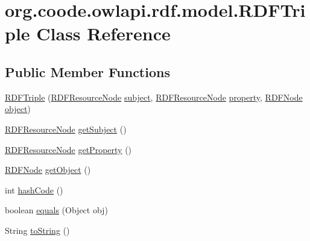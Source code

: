 \hypertarget{classorg_1_1coode_1_1owlapi_1_1rdf_1_1model_1_1_r_d_f_triple}{\section{org.\-coode.\-owlapi.\-rdf.\-model.\-R\-D\-F\-Triple Class Reference}
\label{classorg_1_1coode_1_1owlapi_1_1rdf_1_1model_1_1_r_d_f_triple}
}
\subsection*{Public Member Functions}
\begin{DoxyCompactItemize}
\item 
\hyperlink{classorg_1_1coode_1_1owlapi_1_1rdf_1_1model_1_1_r_d_f_triple_a9f9c792eeb8c7da6ff0cad21a31f2c48}{R\-D\-F\-Triple} (\hyperlink{classorg_1_1coode_1_1owlapi_1_1rdf_1_1model_1_1_r_d_f_resource_node}{R\-D\-F\-Resource\-Node} \hyperlink{classorg_1_1coode_1_1owlapi_1_1rdf_1_1model_1_1_r_d_f_triple_a8e8236c19fd75f36b6f395d2505b2443}{subject}, \hyperlink{classorg_1_1coode_1_1owlapi_1_1rdf_1_1model_1_1_r_d_f_resource_node}{R\-D\-F\-Resource\-Node} \hyperlink{classorg_1_1coode_1_1owlapi_1_1rdf_1_1model_1_1_r_d_f_triple_a6b9f9cd4fed026fa8398be4aa8f736ac}{property}, \hyperlink{classorg_1_1coode_1_1owlapi_1_1rdf_1_1model_1_1_r_d_f_node}{R\-D\-F\-Node} \hyperlink{classorg_1_1coode_1_1owlapi_1_1rdf_1_1model_1_1_r_d_f_triple_aee655bad73651f8c49524098fc1d8b9f}{object})
\item 
\hyperlink{classorg_1_1coode_1_1owlapi_1_1rdf_1_1model_1_1_r_d_f_resource_node}{R\-D\-F\-Resource\-Node} \hyperlink{classorg_1_1coode_1_1owlapi_1_1rdf_1_1model_1_1_r_d_f_triple_a40565a80b2b88a31874c0b728d143d2b}{get\-Subject} ()
\item 
\hyperlink{classorg_1_1coode_1_1owlapi_1_1rdf_1_1model_1_1_r_d_f_resource_node}{R\-D\-F\-Resource\-Node} \hyperlink{classorg_1_1coode_1_1owlapi_1_1rdf_1_1model_1_1_r_d_f_triple_a94f5b40267e6433c5bbe1f0f0066250c}{get\-Property} ()
\item 
\hyperlink{classorg_1_1coode_1_1owlapi_1_1rdf_1_1model_1_1_r_d_f_node}{R\-D\-F\-Node} \hyperlink{classorg_1_1coode_1_1owlapi_1_1rdf_1_1model_1_1_r_d_f_triple_aee6912619a1650344b342a290dbeed19}{get\-Object} ()
\item 
int \hyperlink{classorg_1_1coode_1_1owlapi_1_1rdf_1_1model_1_1_r_d_f_triple_a0dcc4dd351f4abadb0df96a684e3deff}{hash\-Code} ()
\item 
boolean \hyperlink{classorg_1_1coode_1_1owlapi_1_1rdf_1_1model_1_1_r_d_f_triple_a8a4693b4c10d34d1357c5c521639c5c7}{equals} (Object obj)
\item 
String \hyperlink{classorg_1_1coode_1_1owlapi_1_1rdf_1_1model_1_1_r_d_f_triple_ab766514232f74df9e6ec258d0661409b}{to\-String} ()
\end{DoxyCompactItemize}
